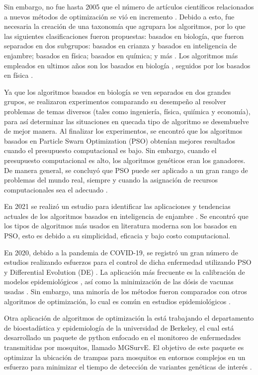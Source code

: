 \documentclass[letterpaper, 10pt, conference]{ieeeconf}
\begin{document}
Sin embargo, no fue hasta 2005 que el número de artículos científicos relacionados a nuevos métodos de optimización se vió en incremento \cite{Taxonomies}. Debido a esto, fue necesaria la creación de una taxonomía que agrupara los algoritmos, por lo que las siguientes clasificaciones fueron propuestas: basados en biología, que fueron separados en dos subgrupos: basados en crianza y basados en inteligencia de enjambre; basados en física; basados en química; y más \cite{Taxonomies}. Los algoritmos más empleados en ultimos años son los basados en biología \cite{Taxonomies}, seguidos por los basados en física \cite{PhysicsBasedRev}.

Ya que los algoritmos basados en biología se ven separados en dos grandes grupos, se realizaron experimentos comparando su desempeño al resolver problemas de temas diversos (tales como ingeniería, física, quiímica y economía), para así determinar las situaciones en quecada tipo de algoritmo se desembuelve de mejor manera. Al finalizar los experimentos, se encontró que los algoritmos basados en Particle Swarn Optimization (PSO) obtenían mejores resultados cuando el presupuesto computacional es bajo. Sin embargo, cuando el presupuesto computacional es alto, los algoritmos genéticos eran los ganadores. De manera general, se concluyó que PSO puede ser aplicado a un gran rango de problemas del mundo real, siempre y cuando la asignación de recursos computacionales sea el adecuado \cite{SwarmVsEvol}.

En 2021 se realizó un estudio para identificar las aplicaciones y tendencias actuales de los algoritmos basados en inteligencia de enjambre \cite{SwarmIntRev}. Se encontró que los tipos de algoritmos más usados en literatura moderna son los basados en PSO, esto es debido a su simplicidad, eficacia y bajo costo computacional.

En  2020, debido a la pandemia de COVID-19, se registró un gran número de estudios realizando esfuerzos para el control de dicha enfermedad utilizando PSO y Differential Evolution (DE) \cite{DE&PSOCov}. La aplicación más frecuente es la calibración de modelos epidemiológicos \cite{DE&PSOCov}, así como la minimización de las dósis de vacunas usadas \cite{COVVacc}. Sin embargo, una minoría de los métodos fueron comparados con otros algoritmos de optimización, lo cual es común en estudios epidemiológicos \cite{DE&PSOCov}.

Otra aplicación de algoritmos de optimización la está trabajando el departamento de bioestadística y epidemiología de la universidad de Berkeley, el cual está desarrollado un paquete de python enfocado en el monitoreo de enfermedades transmitidas por mosquitos, llamado MGSurvE. El objetivo de este paquete es optimizar la ubicación de trampas para mosquitos en entornos complejos en un esfuerzo para minimizar el tiempo de detección de variantes genéticas de interés \cite{MGSurvEPyPi}.
\end{document}
